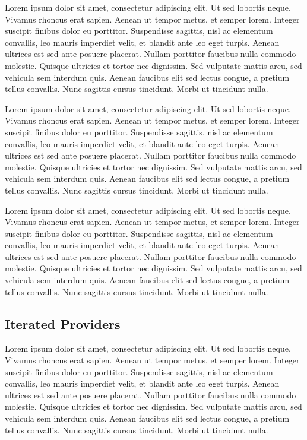 Lorem ipsum dolor sit amet, consectetur adipiscing elit. Ut sed lobortis neque. Vivamus rhoncus erat sapien. Aenean ut tempor metus, et semper lorem. Integer suscipit finibus dolor eu porttitor. Suspendisse sagittis, nisl ac elementum convallis, leo mauris imperdiet velit, et blandit ante leo eget turpis. Aenean ultrices est sed ante posuere placerat. Nullam porttitor faucibus nulla commodo molestie. Quisque ultricies et tortor nec dignissim. Sed vulputate mattis arcu, sed vehicula sem interdum quis. Aenean faucibus elit sed lectus congue, a pretium tellus convallis. Nunc sagittis cursus tincidunt. Morbi ut tincidunt nulla.

Lorem ipsum dolor sit amet, consectetur adipiscing elit. Ut sed lobortis neque. Vivamus rhoncus erat sapien. Aenean ut tempor metus, et semper lorem. Integer suscipit finibus dolor eu porttitor. Suspendisse sagittis, nisl ac elementum convallis, leo mauris imperdiet velit, et blandit ante leo eget turpis. Aenean ultrices est sed ante posuere placerat. Nullam porttitor faucibus nulla commodo molestie. Quisque ultricies et tortor nec dignissim. Sed vulputate mattis arcu, sed vehicula sem interdum quis. Aenean faucibus elit sed lectus congue, a pretium tellus convallis. Nunc sagittis cursus tincidunt. Morbi ut tincidunt nulla.

Lorem ipsum dolor sit amet, consectetur adipiscing elit. Ut sed lobortis neque. Vivamus rhoncus erat sapien. Aenean ut tempor metus, et semper lorem. Integer suscipit finibus dolor eu porttitor. Suspendisse sagittis, nisl ac elementum convallis, leo mauris imperdiet velit, et blandit ante leo eget turpis. Aenean ultrices est sed ante posuere placerat. Nullam porttitor faucibus nulla commodo molestie. Quisque ultricies et tortor nec dignissim. Sed vulputate mattis arcu, sed vehicula sem interdum quis. Aenean faucibus elit sed lectus congue, a pretium tellus convallis. Nunc sagittis cursus tincidunt. Morbi ut tincidunt nulla.

\subsection{Iterated Providers}
Lorem ipsum dolor sit amet, consectetur adipiscing elit. Ut sed lobortis neque. Vivamus rhoncus erat sapien. Aenean ut tempor metus, et semper lorem. Integer suscipit finibus dolor eu porttitor. Suspendisse sagittis, nisl ac elementum convallis, leo mauris imperdiet velit, et blandit ante leo eget turpis. Aenean ultrices est sed ante posuere placerat. Nullam porttitor faucibus nulla commodo molestie. Quisque ultricies et tortor nec dignissim. Sed vulputate mattis arcu, sed vehicula sem interdum quis. Aenean faucibus elit sed lectus congue, a pretium tellus convallis. Nunc sagittis cursus tincidunt. Morbi ut tincidunt nulla.

